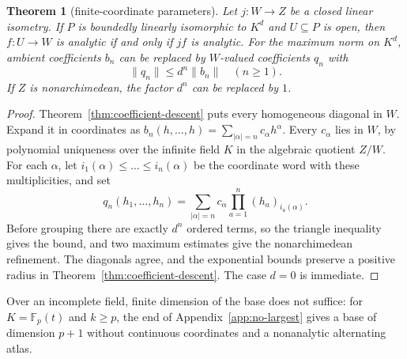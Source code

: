 \documentclass[11pt]{amsart}
\newtheorem{theorem}{Theorem}[section]
\theoremstyle{definition}
\theoremstyle{remark}
\numberwithin{equation}{section}
\newcommand{\F}{\mathbb F}
\newcommand{\norm}[1]{\lVert #1\rVert}
\theoremstyle{plain}
\theoremstyle{definition}
\theoremstyle{plain}
\begin{document}
\begin{theorem}[finite-coordinate parameters]\label{thm:finite-parameters}
Let $j\colon W\to Z$ be a closed linear isometry. If $P$ is boundedly linearly isomorphic to $K^d$ and $U\subseteq P$ is open, then $f\colon U\to W$ is analytic if and only if $jf$ is analytic. For the maximum norm on $K^d$, ambient coefficients $b_n$ can be replaced by $W$-valued coefficients $q_n$ with
\[
 \norm{q_n}\le d^n\norm{b_n}\quad(n\ge1).
\]
If $Z$ is nonarchimedean, the factor $d^n$ can be replaced by $1$.
\end{theorem}
\begin{proof}
Theorem~\ref{thm:coefficient-descent} puts every homogeneous diagonal in $W$. Expand it in coordinates as
$b_n(h,\ldots,h)=\sum_{|\alpha|=n}c_\alpha h^\alpha$. Every $c_\alpha$ lies in $W$, by polynomial uniqueness over the
infinite field $K$ in the algebraic quotient $Z/W$. For each $\alpha$, let $i_1(\alpha)\le\dots\le i_n(\alpha)$ be the coordinate word with
these multiplicities, and set
\[
 q_n(h_1,\ldots,h_n)
 =\sum_{|\alpha|=n}c_\alpha\prod_{a=1}^n(h_a)_{i_a(\alpha)}.
\]
Before grouping there are exactly $d^n$ ordered terms, so the triangle inequality gives the bound, and two maximum
estimates give the nonarchimedean refinement. The diagonals agree, and the exponential bounds preserve a positive radius
in Theorem~\ref{thm:coefficient-descent}. The case $d=0$ is immediate.
\end{proof}

Over an incomplete field, finite dimension of the base does not suffice: for $K=\F_p(t)$ and $k\ge p$, the end of
Appendix~\ref{app:no-largest} gives a base of dimension $p+1$ without continuous coordinates and a nonanalytic alternating atlas.
\end{document}
